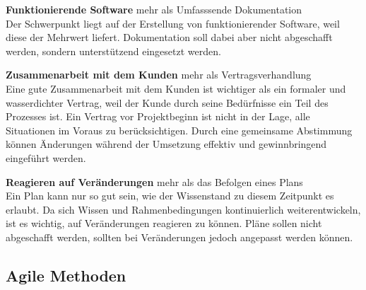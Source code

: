 \documentclass[ngerman]{seminarvorlage}
\begin{document}
\textbf{Funktionierende Software} mehr als Umfasssende Dokumentation\\
Der Schwerpunkt liegt auf der Erstellung von funktionierender Software, weil diese der Mehrwert liefert. Dokumentation soll dabei aber nicht abgeschafft werden, sondern unterstützend eingesetzt werden.

\textbf{Zusammenarbeit mit dem Kunden} mehr als Vertragsverhandlung\\
Eine gute Zusammenarbeit mit dem Kunden ist wichtiger als ein formaler und wasserdichter Vertrag, weil der Kunde durch seine Bedürfnisse ein Teil des Prozesses ist. Ein Vertrag vor Projektbeginn ist nicht in der Lage, alle Situationen im Voraus zu berücksichtigen. Durch eine gemeinsame Abstimmung können Änderungen während der Umsetzung effektiv und gewinnbringend eingeführt werden.

\textbf{Reagieren auf Veränderungen} mehr als das Befolgen eines Plans\\
Ein Plan kann nur so gut sein, wie der Wissenstand zu diesem Zeitpunkt es erlaubt. Da sich Wissen und Rahmenbedingungen kontinuierlich weiterentwickeln, ist es wichtig, auf Veränderungen reagieren zu können. Pläne sollen nicht abgeschafft werden, sollten bei Veränderungen jedoch angepasst werden können.\\


\subsection {Agile Methoden}
\end{document}
